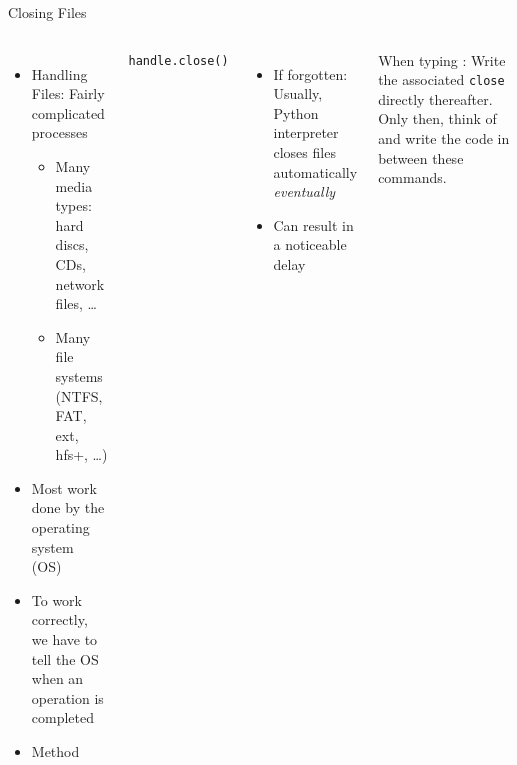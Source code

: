 \begin{frame}[fragile]{Closing Files}
%
\vspace{-12pt}
\begin{columns}[t]
\begin{itemize}
\item Handling Files: Fairly complicated processes
	\begin{itemize}
	\item Many media types: hard discs, CDs, network files, \ldots
	\item Many file systems (NTFS, FAT, ext, hfs+, \ldots)
	\end{itemize}
\item Most work done by the operating system (OS)
\item To work correctly, we have to tell the OS when an operation is completed
\item[\Thus] Method 
\end{itemize}
%
\vspace{-3pt}
\begin{codebox}
\begin{verbatim}
handle.close()
\end{verbatim}
\end{codebox}
%
\begin{itemize}
\item If forgotten: Usually, Python interpreter closes files automatically \emph{eventually}
\item Can result in a noticeable delay
\end{itemize}
%
\begin{hintbox}
\small
When typing : Write the associated \texttt{close} directly thereafter. Only then, think of and write the code in between these commands.
\end{hintbox}
\end{columns}
%
\end{frame}


